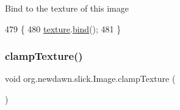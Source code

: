 Bind to the texture of this image 
\begin{DoxyCode}
479                        \{
480         \mbox{\hyperlink{classorg_1_1newdawn_1_1slick_1_1_image_a9fd9ddb21247305c83ac4e37d9d51f79}{texture}}.\mbox{\hyperlink{interfaceorg_1_1newdawn_1_1slick_1_1opengl_1_1_texture_a97c02b82a8170c4c0bccb570dc872873}{bind}}();
481     \}
\end{DoxyCode}
\mbox{\label{classorg_1_1newdawn_1_1slick_1_1_image_a18d37e5c346d316dda2fc5a523d43422}} 
\subsubsection{\texorpdfstring{clamp\+Texture()}{clampTexture()}}
{\footnotesize\ttfamily void org.\+newdawn.\+slick.\+Image.\+clamp\+Texture (\begin{DoxyParamCaption}{ }\end{DoxyParamCaption})\hspace{0.3cm}{\ttfamily [inline]}}

